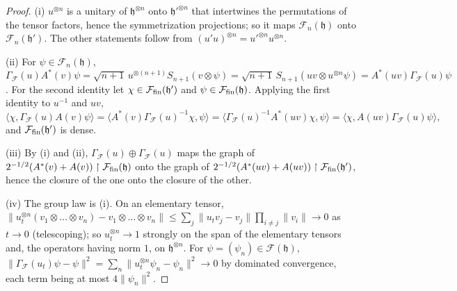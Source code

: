 \documentclass[11pt,a4paper]{article}
\theoremstyle{plain}
\theoremstyle{definition}
\theoremstyle{plain}
\theoremstyle{definition}
\newcommand{\ip}[2]{\langle #1,#2\rangle}
\begin{document}
\begin{proof}
(i) $u^{\otimes n}$ is a unitary of $\mathfrak h^{\otimes n}$ onto $\mathfrak h'^{\otimes n}$
that intertwines the permutations of the tensor factors, hence the symmetrization projections;
so it maps $\mathcal F_n(\mathfrak h)$ onto $\mathcal F_n(\mathfrak h')$.  The other statements
follow from $(u'u)^{\otimes n}=u'^{\otimes n}u^{\otimes n}$.

(ii) For $\psi\in\mathcal F_n(\mathfrak h)$, $\Gamma_{\!\mathcal F}(u)A^*(v)\psi=\sqrt{n+1}\,
u^{\otimes(n+1)}S_{n+1}(v\otimes\psi)=\sqrt{n+1}\,S_{n+1}(uv\otimes u^{\otimes n}\psi)=
A^*(uv)\Gamma_{\!\mathcal F}(u)\psi$.  For the second identity let $\chi\in
\mathcal F_{\rm fin}(\mathfrak h')$ and $\psi\in\mathcal F_{\rm fin}(\mathfrak h)$.  Applying the
first identity to $u^{-1}$ and $uv$,
\[
 \ip\chi{\Gamma_{\!\mathcal F}(u)A(v)\psi}=\ip{A^*(v)\Gamma_{\!\mathcal F}(u)^{-1}\chi}\psi
 =\ip{\Gamma_{\!\mathcal F}(u)^{-1}A^*(uv)\chi}\psi=\ip\chi{A(uv)\Gamma_{\!\mathcal F}(u)\psi},
\]
and $\mathcal F_{\rm fin}(\mathfrak h')$ is dense.

(iii) By (i) and (ii), $\Gamma_{\!\mathcal F}(u)\oplus\Gamma_{\!\mathcal F}(u)$ maps the graph of
$2^{-1/2}(A^*(v)+A(v))\upharpoonright\mathcal F_{\rm fin}(\mathfrak h)$ onto the graph of
$2^{-1/2}(A^*(uv)+A(uv))\upharpoonright\mathcal F_{\rm fin}(\mathfrak h')$, hence the closure of
the one onto the closure of the other.

(iv) The group law is (i).  On an elementary tensor, $\|u_t^{\otimes n}(v_1\otimes\dots\otimes
v_n)-v_1\otimes\dots\otimes v_n\|\le\sum_j\|u_tv_j-v_j\|\prod_{i\ne j}\|v_i\|\to0$ as $t\to0$
(telescoping); so $u_t^{\otimes n}\to1$ strongly on the span of the elementary tensors and, the
operators having norm $1$, on $\mathfrak h^{\otimes n}$.  For $\psi=(\psi_n)\in
\mathcal F(\mathfrak h)$, $\|\Gamma_{\!\mathcal F}(u_t)\psi-\psi\|^2=\sum_n\|u_t^{\otimes n}
\psi_n-\psi_n\|^2\to0$ by dominated convergence, each term being at most $4\|\psi_n\|^2$.
\end{proof}
\end{document}
